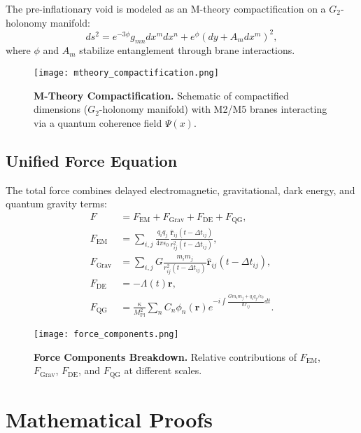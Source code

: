 \documentclass[12pt, a4paper]{article}
\begin{document}
The pre-inflationary void is modeled as an M-theory compactification on a \(G_2\)-holonomy manifold:
\[
ds^2 = e^{-3\phi} g_{mn} dx^m dx^n + e^{\phi} (dy + A_m dx^m)^2,
\]
where \(\phi\) and \(A_m\) stabilize entanglement through brane interactions.

\begin{figure}[h]
\centering
\texttt{[image: mtheory\_compactification.png]}
\caption{\textbf{M-Theory Compactification.} Schematic of compactified dimensions (\(G_2\)-holonomy manifold) with M2/M5 branes interacting via a quantum coherence field \(\Psi(x)\).}
\label{fig:mtheory}
\end{figure}

\subsection*{Unified Force Equation}

The total force combines delayed electromagnetic, gravitational, dark energy, and quantum gravity terms:
\begin{align}
F &= F_{\text{EM}} + F_{\text{Grav}} + F_{\text{DE}} + F_{\text{QG}}, \label{eq:force} \\
F_{\text{EM}} &= \sum_{i,j} \frac{q_i q_j}{4\pi \epsilon_0} \frac{\hat{\bm{r}}_{ij}(t - \Delta t_{ij})}{r_{ij}^2(t - \Delta t_{ij})}, \nonumber \\
F_{\text{Grav}} &= \sum_{i,j} G \frac{m_i m_j}{r_{ij}^2(t - \Delta t_{ij})} \hat{\bm{r}}_{ij}(t - \Delta t_{ij}), \nonumber \\
F_{\text{DE}} &= -\Lambda(t) \bm{r}, \nonumber \\
F_{\text{QG}} &= \frac{\kappa}{M_{\text{Pl}}^2} \sum_{n} C_n \phi_n(\bm{r}) e^{-i \int \frac{G m_i m_j + q_i q_j / \epsilon_0}{\hbar r_{ij}} dt}. \nonumber
\end{align}

\begin{figure}[h]
\centering
\texttt{[image: force\_components.png]}
\caption{\textbf{Force Components Breakdown.} Relative contributions of \(F_{\text{EM}}\), \(F_{\text{Grav}}\), \(F_{\text{DE}}\), and \(F_{\text{QG}}\) at different scales.}
\label{fig:force}
\end{figure}

\section*{Mathematical Proofs}
\end{document}
